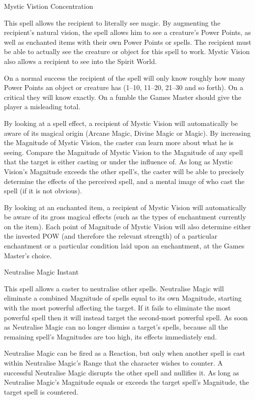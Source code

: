 \begin{samepage}
\begin{rpg-spell}
{Mystic Vistion}
{Concentration}

This spell allows the recipient to literally see magic. By augmenting the recipient’s natural vision, the spell allows him to see a creature’s Power Points, as well as enchanted items with their own Power Points or spells. The recipient must be able to actually see the creature or object for this spell to work. Mystic Vision also allows a recipient to see into the Spirit World.

On a normal success the recipient of the spell will only know roughly how many Power Points an object or creature has (1–10, 11–20, 21–30 and so forth). On a critical they will know exactly. On a fumble the Games Master should give the player a misleading total.

By looking at a spell effect, a recipient of Mystic Vision will automatically be aware of its magical origin (Arcane Magic, Divine Magic or Magic). By increasing the Magnitude of Mystic Vision, the caster can learn more about what he is seeing. Compare the Magnitude of Mystic Vision to the Magnitude of any spell that the target is either casting or under the influence of. As long as Mystic Vision’s Magnitude exceeds the other spell’s, the caster will be able to precisely determine the effects of the perceived spell, and a mental image of who cast the spell (if it is not obvious). 

By looking at an enchanted item, a recipient of Mystic Vision will automatically be aware of its gross magical effects (such as the types of enchantment currently on the item). Each point of Magnitude of Mystic Vision will also determine either the invested POW (and therefore the relevant strength) of a particular enchantment or a particular condition laid upon an enchantment, at the Games Master’s choice.
\end{rpg-spell}
\end{samepage}


\begin{samepage}
\begin{rpg-spell}
{Neutralise Magic}
{Instant}

This spell allows a caster to neutralise other spells. Neutralise Magic will eliminate a combined Magnitude of spells equal to its own Magnitude, starting with the most powerful affecting the target. If it fails to eliminate the most powerful spell then it will instead target the second-most powerful spell. As soon as Neutralise Magic can no longer dismiss a target’s spells, because all the remaining spell’s Magnitudes are too high, its effects immediately end. 

Neutralise Magic can be fired as a Reaction, but only when another spell is cast within Neutralise Magic’s Range that the character wishes to counter. A successful Neutralise Magic disrupts the other spell and nullifies it. As long as Neutralise Magic’s Magnitude equals or exceeds the target spell’s Magnitude, the target spell is countered. 
\end{rpg-spell}
\end{samepage}


